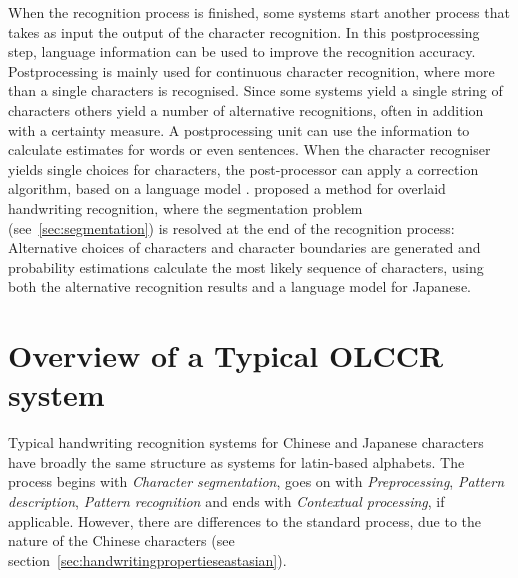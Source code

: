 When the recognition process is finished, some systems start another process
that takes as input the output of the character recognition. In this 
postprocessing step, language information can be used to improve the recognition
accuracy. Postprocessing is mainly used for continuous character recognition,
where more than a single characters is recognised. Since some systems yield a 
single string of characters others yield a number of alternative recognitions,
often in addition with a certainty measure.
A postprocessing unit can use the information to calculate estimates for words
or even sentences. When the character recogniser yields single choices for 
characters, the post-processor can apply a correction algorithm, based on a 
language model .
 proposed a method for overlaid handwriting 
recognition, where the segmentation problem (see~\ref{sec:segmentation}) is 
resolved at the end of the recognition process: Alternative choices of characters
and character boundaries are generated and probability estimations calculate
the most likely sequence of characters, using both the alternative recognition
results and a language model for Japanese.

\section{Overview of a Typical OLCCR system}
\label{sec:olccr:overview}


Typical handwriting recognition systems for Chinese and Japanese characters 
have broadly the same structure as systems for latin-based alphabets. The 
process begins with \emph{Character segmentation}, goes on with 
\emph{Preprocessing}, \emph{Pattern description}, \emph{Pattern recognition} and 
ends with \emph{Contextual processing}, if applicable. 
However, there are differences to the standard process, due to the nature of 
the Chinese characters (see section~\ref{sec:handwritingpropertieseastasian}).

